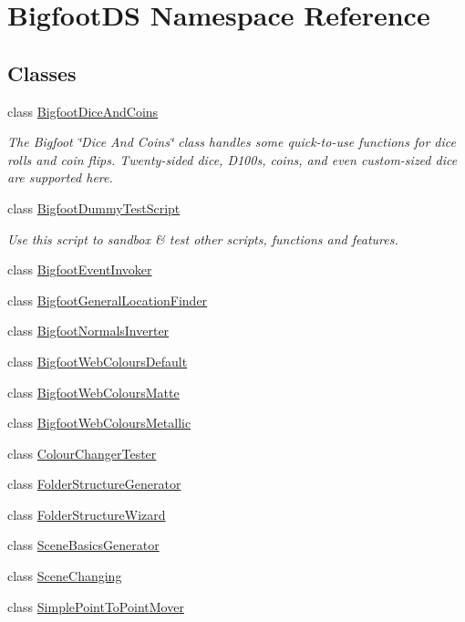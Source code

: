 \hypertarget{namespace_bigfoot_d_s}{}\section{Bigfoot\+DS Namespace Reference}
\label{namespace_bigfoot_d_s}
\subsection*{Classes}
\begin{DoxyCompactItemize}
\item 
class \mbox{\hyperlink{class_bigfoot_d_s_1_1_bigfoot_dice_and_coins}{Bigfoot\+Dice\+And\+Coins}}
\begin{DoxyCompactList}\small\item\em The Bigfoot \char`\"{}\+Dice And Coins\char`\"{} class handles some quick-\/to-\/use functions for dice rolls and coin flips. Twenty-\/sided dice, D100s, coins, and even custom-\/sized dice are supported here. \end{DoxyCompactList}\item 
class \mbox{\hyperlink{class_bigfoot_d_s_1_1_bigfoot_dummy_test_script}{Bigfoot\+Dummy\+Test\+Script}}
\begin{DoxyCompactList}\small\item\em Use this script to sandbox \& test other scripts, functions and features. \end{DoxyCompactList}\item 
class \mbox{\hyperlink{class_bigfoot_d_s_1_1_bigfoot_event_invoker}{Bigfoot\+Event\+Invoker}}
\item 
class \mbox{\hyperlink{class_bigfoot_d_s_1_1_bigfoot_general_location_finder}{Bigfoot\+General\+Location\+Finder}}
\item 
class \mbox{\hyperlink{class_bigfoot_d_s_1_1_bigfoot_normals_inverter}{Bigfoot\+Normals\+Inverter}}
\item 
class \mbox{\hyperlink{class_bigfoot_d_s_1_1_bigfoot_web_colours_default}{Bigfoot\+Web\+Colours\+Default}}
\item 
class \mbox{\hyperlink{class_bigfoot_d_s_1_1_bigfoot_web_colours_matte}{Bigfoot\+Web\+Colours\+Matte}}
\item 
class \mbox{\hyperlink{class_bigfoot_d_s_1_1_bigfoot_web_colours_metallic}{Bigfoot\+Web\+Colours\+Metallic}}
\item 
class \mbox{\hyperlink{class_bigfoot_d_s_1_1_colour_changer_tester}{Colour\+Changer\+Tester}}
\item 
class \mbox{\hyperlink{class_bigfoot_d_s_1_1_folder_structure_generator}{Folder\+Structure\+Generator}}
\item 
class \mbox{\hyperlink{class_bigfoot_d_s_1_1_folder_structure_wizard}{Folder\+Structure\+Wizard}}
\item 
class \mbox{\hyperlink{class_bigfoot_d_s_1_1_scene_basics_generator}{Scene\+Basics\+Generator}}
\item 
class \mbox{\hyperlink{class_bigfoot_d_s_1_1_scene_changing}{Scene\+Changing}}
\item 
class \mbox{\hyperlink{class_bigfoot_d_s_1_1_simple_point_to_point_mover}{Simple\+Point\+To\+Point\+Mover}}
\end{DoxyCompactItemize}
